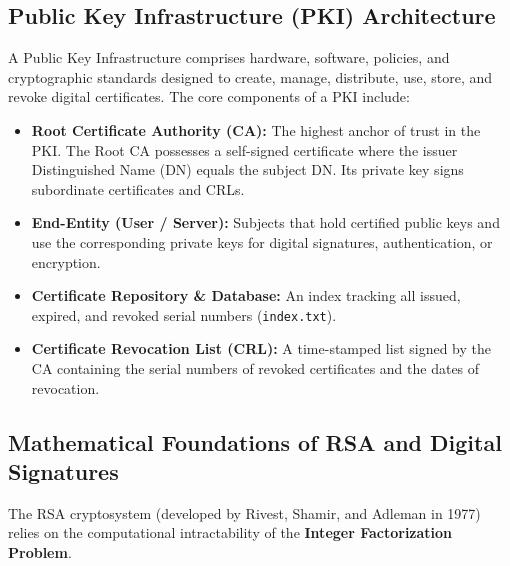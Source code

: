 \documentclass[12pt,a4paper]{article}
\begin{document}
\subsection{Public Key Infrastructure (PKI) Architecture}
A Public Key Infrastructure comprises hardware, software, policies, and cryptographic standards designed to create, manage, distribute, use, store, and revoke digital certificates. The core components of a PKI include:
\begin{itemize}
    \item \textbf{Root Certificate Authority (CA):} The highest anchor of trust in the PKI. The Root CA possesses a self-signed certificate where the issuer Distinguished Name (DN) equals the subject DN. Its private key signs subordinate certificates and CRLs.
    \item \textbf{End-Entity (User / Server):} Subjects that hold certified public keys and use the corresponding private keys for digital signatures, authentication, or encryption.
    \item \textbf{Certificate Repository \& Database:} An index tracking all issued, expired, and revoked serial numbers (\texttt{index.txt}).
    \item \textbf{Certificate Revocation List (CRL):} A time-stamped list signed by the CA containing the serial numbers of revoked certificates and the dates of revocation.
\end{itemize}

\subsection{Mathematical Foundations of RSA and Digital Signatures}
The RSA cryptosystem (developed by Rivest, Shamir, and Adleman in 1977) relies on the computational intractability of the \textbf{Integer Factorization Problem}. 
\end{document}
